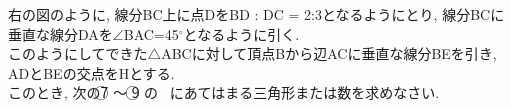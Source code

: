 \documentclass[dvipdfmx, titlepage, 11pt]{jsarticle}
\newcommand{\ncircle}[1]{\textcircled{\scriptsize #1}}
\newcommand{\ebox}{\fbox{　\hspace{10pt} }}
\begin{document}
\begin{minipage}{0.6\hsize}
  \noindent {}\hspace{10pt} 右の図のように, 線分BC上に点DをBD : DC = 2:3となるようにとり, 線分BCに垂直な線分DAを$\angle$BAC=45${}^{\circ}$となるように引く.\\
  このようにしてできた$\triangle$ABCに対して頂点Bから辺ACに垂直な線分BEを引き, ADとBEの交点をHとする.\\
  このとき, 次の\ncircle{7} 〜 \ncircle{9} の \ebox \ にあてはまる三角形または数を求めなさい.
\end{minipage}
\begin{minipage}{0.36\hsize}
  \begin{center}
  \end{center}
\end{minipage}
\end{document}
